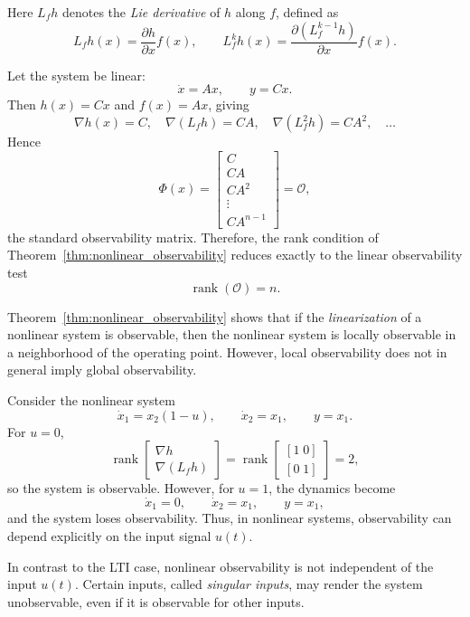Here $L_f h$ denotes the \emph{Lie derivative} of $h$ along $f$,
defined as
\[
L_f h(x) = \frac{\partial h}{\partial x} f(x),
\qquad
L_f^k h(x) = \frac{\partial (L_f^{k-1}h)}{\partial x} f(x).
\]

\begin{example}
Let the system be linear:
\[
\dot{x} = A x, \qquad y = C x.
\]
Then $h(x) = Cx$ and $f(x) = A x$, giving
\[
\nabla h(x) = C, \quad
\nabla (L_f h) = C A, \quad
\nabla (L_f^2 h) = C A^2, \quad \dots
\]
Hence
\[
\Phi(x) =
\begin{bmatrix}
    C \\ CA \\ CA^2 \\ \vdots \\ CA^{n-1}
\end{bmatrix}
= \mathcal{O},
\]
the standard observability matrix.
Therefore, the rank condition of Theorem~\ref{thm:nonlinear_observability}
reduces exactly to the linear observability test
\[
\operatorname{rank}(\mathcal{O}) = n.
\]
\end{example}

\begin{remark}
Theorem~\ref{thm:nonlinear_observability} shows that if the \emph{linearization}
of a nonlinear system is observable, then the nonlinear system is locally observable
in a neighborhood of the operating point.  
However, local observability does not in general imply global observability.
\end{remark}

\begin{example}
Consider the nonlinear system
\[
\dot{x}_1 = x_2(1 - u), \qquad 
\dot{x}_2 = x_1, \qquad
y = x_1.
\]
For $u = 0$,
\[
\operatorname{rank}
\begin{bmatrix}
\nabla h\\
\nabla (L_f h)
\end{bmatrix}
=
\operatorname{rank}
\begin{bmatrix}
[1\; 0]\\[2pt]
[0\; 1]
\end{bmatrix}
= 2,
\]
so the system is observable.  
However, for $u = 1$, the dynamics become
\[
\dot{x}_1 = 0, \qquad \dot{x}_2 = x_1, \qquad y = x_1,
\]
and the system loses observability.
Thus, in nonlinear systems, observability can depend explicitly on the input signal $u(t)$.
\end{example}

\begin{remark}
In contrast to the LTI case, nonlinear observability is not independent of the input $u(t)$.
Certain inputs, called \emph{singular inputs}, may render the system unobservable,
even if it is observable for other inputs.
\end{remark}

